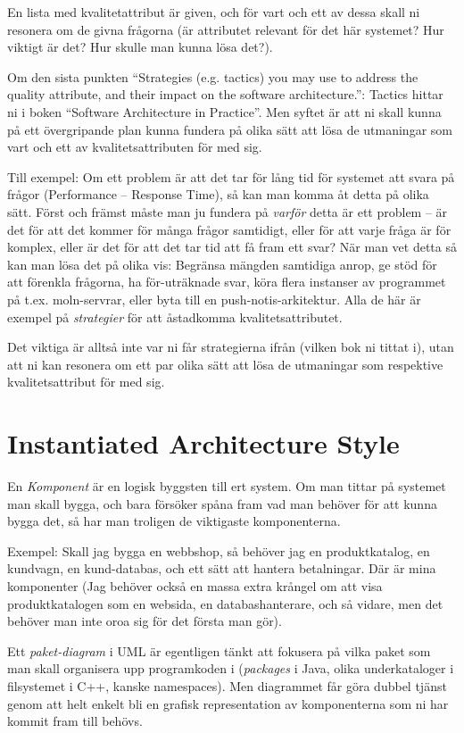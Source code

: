 \documentclass[8pt,oneside]{memoir}
\begin{document}
En lista med kvalitetattribut är given, och för vart och ett av dessa skall ni resonera om de givna frågorna (är attributet relevant för det här systemet? Hur viktigt är det? Hur skulle man kunna lösa det?).

Om den sista punkten ``Strategies (e.g. tactics) you may use to address the quality attribute, and their impact on the software architecture.'': Tactics hittar ni i boken ``Software Architecture in Practice''. Men syftet är att ni skall kunna på ett övergripande plan kunna fundera på olika sätt att lösa de utmaningar som vart och ett av kvalitetsattributen för med sig.

Till exempel: Om ett problem är att det tar för lång tid för systemet att svara på frågor (Performance -- Response Time), så kan man komma åt detta på olika sätt. Först och främst måste man ju fundera på \emph{varför} detta är ett problem -- är det för att det kommer för många frågor samtidigt, eller för att varje fråga är för komplex, eller är det för att det tar tid att få fram ett svar? När man vet detta så kan man lösa det på olika vis: Begränsa mängden samtidiga anrop, ge stöd för att förenkla frågorna, ha för-uträknade svar, köra flera instanser av programmet på t.ex. moln-servrar, eller byta till en push-notis-arkitektur. Alla de här är exempel på \emph{strategier} för att åstadkomma kvalitetsattributet.

Det viktiga är alltså inte var ni får strategierna ifrån (vilken bok ni tittat i), utan att ni kan resonera om ett par olika sätt att lösa de utmaningar som respektive kvalitetsattribut för med sig.
\chapter{Instantiated Architecture Style}
\label{sec:org2a8aae4}
En \emph{Komponent} är en logisk byggsten till ert system. Om man tittar på systemet man skall bygga, och bara försöker spåna fram vad man behöver för att kunna bygga det, så har man troligen de viktigaste komponenterna.

Exempel: Skall jag bygga en webbshop, så behöver jag en produktkatalog, en kundvagn, en kund-databas, och ett sätt att hantera betalningar. Där är mina komponenter (Jag behöver också en massa extra krångel om att visa produktkatalogen som en websida, en databashanterare, och så vidare, men det behöver man inte oroa sig för det första man gör).

Ett \emph{paket-diagram} i UML är egentligen tänkt att fokusera på vilka paket som man skall organisera upp programkoden i (\emph{packages} i Java, olika underkataloger i filsystemet i C++, kanske namespaces). Men diagrammet får göra dubbel tjänst genom att helt enkelt bli en grafisk representation av komponenterna som ni har kommit fram till behövs.
\end{document}

